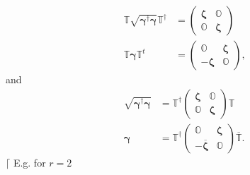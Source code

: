 \documentclass[aps, preprint]{revtex4}
\begin{document}
\begin{align}\mathbb{T} \sqrt{\mathbf{\gamma }^{ \dag } \mathbf{\gamma }} \mathbb{T}^{ \dag } &  =\left (\begin{array}{cc}\mathbf{\zeta } & \mathbb{O} \\
\mathbb{O} & \mathbf{\zeta }\end{array}\right ) \\
\mathbb{T} \mathbf{\gamma } \mathbb{T}^{t} &  =\left (\begin{array}{cc}\mathbb{O} & \mathbf{\zeta } \\
 -\mathbf{\zeta } & \mathbb{O}\end{array}\right )\text{,}\end{align}and
\begin{align}\sqrt{\mathbf{\gamma }^{ \dag } \mathbf{\gamma }} &  =\mathbb{T}^{ \dag } \left (\begin{array}{cc}\mathbf{\zeta } & \mathbb{O} \\
\mathbb{O} & \mathbf{\zeta }\end{array}\right ) \mathbb{T} \\
\mathbf{\gamma } &  =\mathbb{T}^{ \dag } \left (\begin{array}{cc}\mathbb{O} & \mathbf{\zeta } \\
 -\overline{\mathbf{\zeta }} & \mathbb{O}\end{array}\right ) \overline{\mathbb{T}}\text{.}\end{align}$\lceil $ E.g. for $r =2$ 
\end{document}
